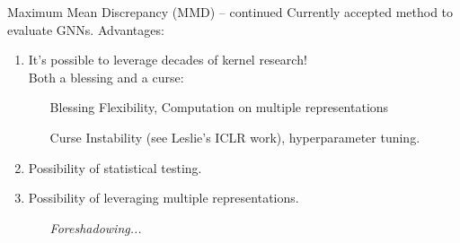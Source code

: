 \documentclass[aspectratio=169, 10pt, dvipsnames]{beamer}
\begin{document}
\begin{frame}[fragile]{Maximum Mean Discrepancy (MMD) -- continued}
  \pause\small Currently accepted method to evaluate GNNs.
  \pause Advantages:
  \begin{enumerate}
    \pause\item \small It's possible to leverage decades of kernel research!\\ Both a
    \textcolor{PineGreen}{blessing} and a \textcolor{YellowOrange}{curse}:
    \begin{itemize}
      \pause\item[\textcolor{PineGreen}{Blessing}] Flexibility, Computation on
      multiple representations
      \pause\item[\textcolor{YellowOrange}{Curse}] Instability (see Leslie's ICLR work), hyperparameter tuning.
    \end{itemize}
  \pause\item \small Possibility of statistical testing.
  \pause\item \small Possibility of leveraging multiple representations.
    \begin{itemize}
      \pause\item[] \emph{Foreshadowing...}
    \end{itemize}
  \end{enumerate}
\end{frame}
\end{document}
